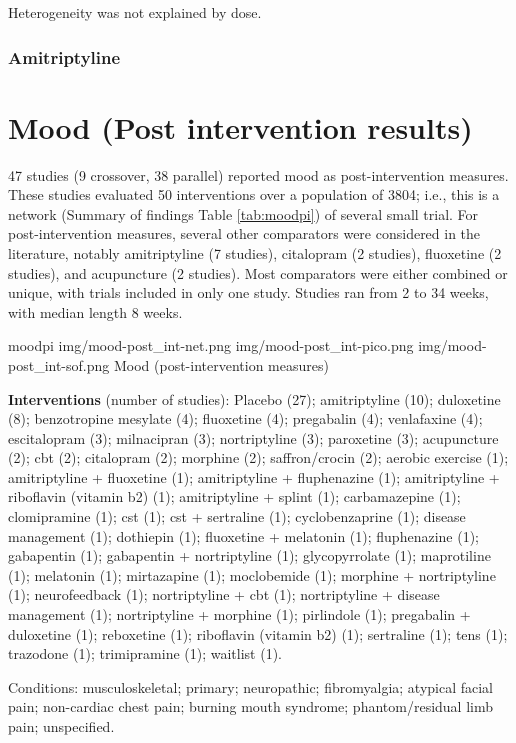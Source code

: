 \documentclass{report}\usepackage[]{graphicx}\usepackage[]{color}
\begin{document}
Heterogeneity was not explained by dose.

\subsubsection{Amitriptyline}


\section{Mood (Post intervention results)}

47 studies (9 crossover, 38 parallel) reported mood as post-intervention measures. These studies evaluated 50 interventions over a population of 3804; i.e., this is a network (Summary of findings Table \ref{tab:moodpi}) of several small trial. For post-intervention measures, several other comparators were considered in the literature, notably amitriptyline (7 studies), citalopram (2 studies), fluoxetine (2 studies), and acupuncture (2 studies). Most comparators were either combined or unique, with trials included in only one study. Studies ran from 2 to 34 weeks, with median length 8 weeks.

\soffignew
{moodpi}
{img/mood-post_int-net.png}
{img/mood-post_int-pico.png}
{img/mood-post_int-sof.png}
{Mood (post-intervention measures)}

\textbf{Interventions} (number of studies): Placebo (27); amitriptyline (10); duloxetine (8); benzotropine mesylate (4); fluoxetine (4); pregabalin (4); venlafaxine (4); escitalopram (3); milnacipran (3); nortriptyline (3); paroxetine (3); acupuncture (2); cbt (2); citalopram (2); morphine (2); saffron/crocin (2); aerobic exercise (1); amitriptyline + fluoxetine (1); amitriptyline + fluphenazine (1); amitriptyline + riboflavin (vitamin b2) (1); amitriptyline + splint (1); carbamazepine (1); clomipramine (1); cst (1); cst + sertraline (1); cyclobenzaprine (1); disease management (1); dothiepin (1); fluoxetine + melatonin (1); fluphenazine (1); gabapentin (1); gabapentin + nortriptyline (1); glycopyrrolate (1); maprotiline (1); melatonin (1); mirtazapine (1); moclobemide (1); morphine + nortriptyline (1); neurofeedback (1); nortriptyline + cbt (1); nortriptyline + disease management (1); nortriptyline + morphine (1); pirlindole (1); pregabalin + duloxetine (1); reboxetine (1); riboflavin (vitamin b2) (1); sertraline (1); tens (1); trazodone (1); trimipramine (1); waitlist (1).

Conditions: musculoskeletal; primary; neuropathic; fibromyalgia; atypical facial pain; non-cardiac chest pain; burning mouth syndrome; phantom/residual limb pain; unspecified.
\end{document}
